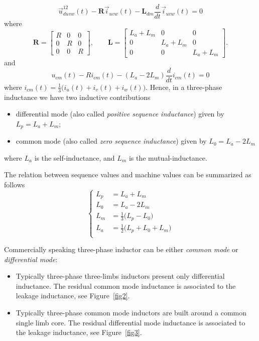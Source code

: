 \documentclass[11pt,a4paper]{scrartcl}
\begin{document}
\begin{onehalfspace}
	\begin{equation}
		\vec{u}_{duvw}^{12}(t) - \mathbf{R}\vec{i}_{uvw}(t) - \mathbf{L}_{dm}\frac{d}{dt}\vec{i}_{uvw}(t) = 0
	\end{equation}
	where
	\begin{equation}
		\mathbf{R} = \begin{bmatrix} R & 0 & 0 \\ 0 & R & 0 \\ 0 & 0 & R \end{bmatrix}, \qquad 
		\mathbf{L} = \begin{bmatrix} L_a+L_m & 0 & 0 \\ 0 & L_a+L_m & 0 \\ 0 & 0 & L_a+L_m \end{bmatrix}.
	\end{equation}
	and 
	\begin{equation}
		{u}_{cm}(t) - R {i}_{cm}(t) - (L_a-2L_m)\frac{d}{dt}{i}_{cm}(t) = 0
	\end{equation}
	where ${i}_{cm}(t) = \frac{1}{3}\Big(i_u(t)+i_v(t)+i_w(t)\Big)$.
	Hence, in a three-phase inductance we have two inductive contributions
	\begin{itemize}
		\item[--] differential mode (also called \textit{positive sequence inductance}) given by $L_p = L_a + L_m$;
		\item[--] common mode (also called \textit{zero sequence inductance}) given by $L_0 = L_a -2L_m$
	\end{itemize}
	where $L_a$ is the self-inductance, and $L_m$ is the mutual-inductance.
	
	The relation between sequence values and machine values can be summarized as follows
	\begin{equation}\left\lbrace 
		\begin{aligned}
			L_p &= L_a + L_m \\[6pt]
			L_0 &= L_a -2L_m  \\[6pt]
			L_m &= \frac{1}{3}\Big(L_p - L_0\Big) \\[6pt]
			L_a &= \frac{1}{2}\Big(L_p + L_0 + L_m\Big) \\[6pt]
		\end{aligned}\right. 
	\end{equation}
	
	Commercially speaking three-phase inductor can be either \textit{common mode} or \textit{differential mode}:
	\begin{itemize}
		\item[--] Typically three-phase three-limbs inductors present only differential inductance. The residual common mode inductance is associated to the leakage inductance, see Figure~\ref{fig2}.
		\item[--] Typically three-phase common mode inductors are built around a common single limb core. The residual differential mode inductance is associated to the leakage inductance, see Figure~\ref{fig3}.
	\end{itemize}
	

\end{onehalfspace}
\end{document}
